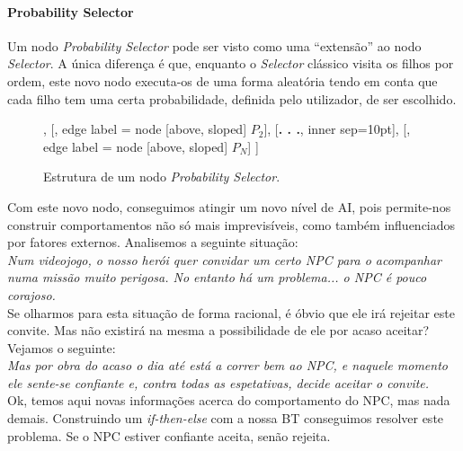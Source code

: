 \paragraph{Probability Selector}{
    
    Um nodo \textit{Probability Selector} pode ser visto como uma ``extensão'' ao nodo \textit{Selector}. 
    A única diferença é que, enquanto o \textit{Selector} clássico visita os filhos por ordem, este novo nodo executa-os de uma forma aleatória tendo em conta que cada filho tem uma certa probabilidade, definida pelo utilizador, de ser escolhido.

    \begin{figure}[H]
    \centering
    \begin{behavior}
        [\probselector
            [\action{Child 1}, edge label = {node [above, sloped] {$P_1$}}],
            [, edge label = {node [above, sloped] {$P_2$}}],
            [{\textbf{. . .}}, inner sep=10pt],
            [, edge label = {node [above, sloped] {$P_N$}}]
        ]
    \end{behavior}
    \caption{Estrutura de um nodo \textit{Probability Selector}.}
    \label{fig:2.6}
    \end{figure}

    Com este novo nodo, conseguimos atingir um novo nível de AI, pois permite-nos construir comportamentos não só mais imprevisíveis, como também influenciados por fatores externos.
    Analisemos a seguinte situação:
    \\

    \textit{
        Num videojogo, o nosso herói quer convidar um certo NPC para o acompanhar numa missão muito perigosa.
        No entanto há um problema... o NPC é pouco corajoso.
    }
    \\

    Se olharmos para esta situação de forma racional, é óbvio que ele irá rejeitar este convite.
    Mas não existirá na mesma a possibilidade de ele por acaso aceitar?
    Vejamos o seguinte:
    \\

    \textit{
        Mas por obra do acaso o dia até está a correr bem ao NPC, e naquele momento ele sente-se confiante e, contra todas as espetativas, decide aceitar o convite.
    }
    \\

    Ok, temos aqui novas informações acerca do comportamento do NPC, mas nada demais.
    Construindo um \textit{if-then-else} com a nossa BT conseguimos resolver este problema.
    Se o NPC estiver confiante aceita, senão rejeita.

}
